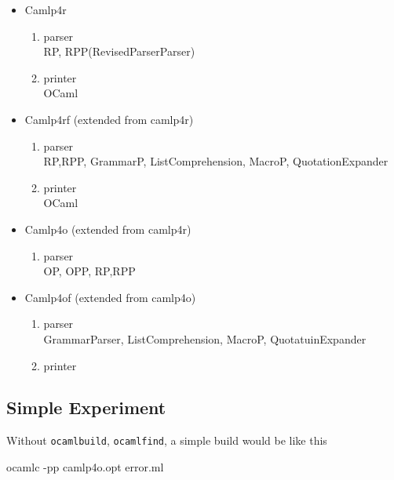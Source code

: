 \begin{itemize}  
\item Camlp4r
    \begin{enumerate}
    \item parser \\
      RP, RPP(RevisedParserParser)
    \item printer \\
      OCaml
    \end{enumerate}
\item Camlp4rf (extended from camlp4r)
    \begin{enumerate}
    \item parser \\
      RP,RPP, GrammarP, ListComprehension, MacroP, QuotationExpander
    \item printer \\
      OCaml
    \end{enumerate}
\item Camlp4o (extended from camlp4r)
    \begin{enumerate}
    \item parser \\
      OP, OPP, RP,RPP
    \end{enumerate}
\item Camlp4of (extended from camlp4o)
    \begin{enumerate}
    \item parser \\
      GrammarParser, ListComprehension, MacroP, QuotatuinExpander
    \item printer 
    \end{enumerate}
\end{itemize}


\subsection{Simple Experiment}


Without \verb|ocamlbuild|, \verb|ocamlfind|, a simple build would be
like this

\begin{bashcode}
ocamlc -pp camlp4o.opt error.ml
\end{bashcode}  








